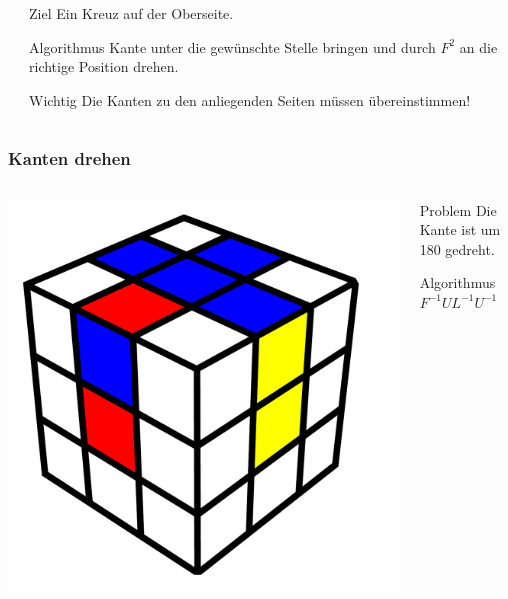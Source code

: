 \begin{frame}
\begin{columns}[c]
\begin{column}[C]{.5\textwidth}
		\end{column}
		\begin{column}[C]{.5\textwidth}
			\begin{block}{Ziel}
				Ein Kreuz auf der Oberseite.
			\end{block}
			\begin{exampleblock}{Algorithmus}
				Kante \glqq unter\grqq{} die gewünschte Stelle bringen und durch $F^2$ an die richtige Position drehen.
			\end{exampleblock}
			\begin{alertblock}{Wichtig}
				Die Kanten zu den anliegenden Seiten müssen übereinstimmen!
			\end{alertblock}
		\end{column}
	\end{columns}
	
\end{frame}

\begin{frame}
	\frametitle{Kanten drehen}
	
	\begin{columns}[c]
		\begin{column}[C]{.5\textwidth}
			\center
			\includegraphics[scale=0.3]{img/nodeflip}
		\end{column}
		\begin{column}[C]{.5\textwidth}
			\begin{alertblock}{Problem}
				Die Kante ist um 180\gradneu{} gedreht.
			\end{alertblock}
			\begin{exampleblock}{Algorithmus}
				$F^{-1}UL^{-1}U^{-1}$
			\end{exampleblock}
		\end{column}
	\end{columns}
	
\end{frame}

